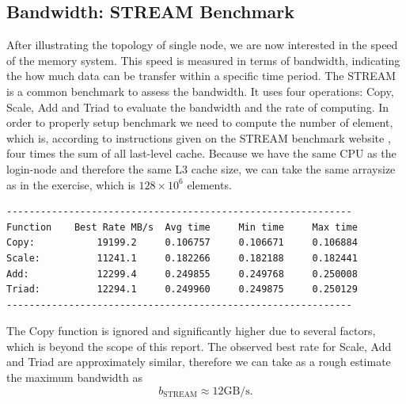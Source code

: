 \subsection{Bandwidth: STREAM Benchmark}
After illustrating the topology of single node, we are now interested in the speed of the memory system. This speed is measured in terms of bandwidth, indicating the how much data can be transfer within a specific time period. The STREAM is a common benchmark to assess the bandwidth. It uses four operations: Copy, Scale, Add and Triad to evaluate the bandwidth and the rate of computing. In order to properly setup benchmark we need to compute the number of element, which is, according to instructions given on the STREAM benchmark website \cite{noauthor_memory_nodate}, four times the sum of all last-level cache. Because we have the same CPU as the login-node and therefore the same L3 cache size, we can take the same arraysize as in the exercise, which is $128 \times 10^6$ elements.
\begin{lstlisting}[language=bash, caption=Output of STREAM benchmark]
-------------------------------------------------------------
Function    Best Rate MB/s  Avg time     Min time     Max time
Copy:           19199.2     0.106757     0.106671     0.106884
Scale:          11241.1     0.182266     0.182188     0.182441
Add:            12299.4     0.249855     0.249768     0.250008
Triad:          12294.1     0.249960     0.249875     0.250129
-------------------------------------------------------------
\end{lstlisting}
The Copy function is ignored and significantly higher due to several factors, which is beyond the scope of this report.
The observed best rate for Scale, Add and Triad are approximately similar, therefore we can take as a rough estimate the maximum bandwidth as
\begin{equation} \label{eq:stream}
	b_{\text{STREAM}} \approx 12 \text{GB/s}.
\end{equation}

